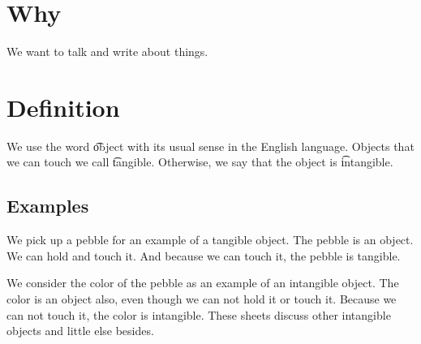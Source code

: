 
\section*{Why}

We want to talk and write about things.

\section*{Definition}

We use the word \t{object} with its usual sense in the English language.
Objects that we can touch we call \t{tangible}.
Otherwise, we say that the object is \t{intangible}.

\subsection*{Examples}

We pick up a pebble for an example of a tangible object.
The pebble is an object.
We can hold and touch it.
And because we can touch it, the pebble is tangible.

We consider the color of the pebble as an example of an intangible object.
The color is an object also, even though we can not hold it or touch it.
Because we can not touch it, the color is intangible.
These sheets discuss other intangible objects and little else besides.

\blankpage